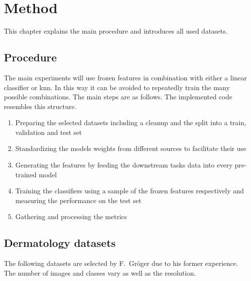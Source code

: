 \chapter{Method}\label{chapter_3}
This chapter explains the main procedure and introduces all used datasets.

\section{Procedure}
The main experiments will use frozen features in combination with either a linear classifier or \gls{knn}.
In this way it can be avoided to repeatedly train the many possible combinations.
The main steps are as follows.
The implemented code resembles this structure.

\begin{enumerate}
    \item Preparing the selected datasets including a cleanup and the split into a train, validation and test set
    \item Standardizing the models weights from different sources to facilitate their use
    \item Generating the features by feeding the downstream tasks data into every pre-trained model
    \item Training the classifiers using a sample of the frozen features respectively and measuring the performance on the test set
    \item Gathering and processing the metrics 
\end{enumerate}



\section{Dermatology datasets}\label{section:derma_datasets}
The following datasets are selected by F.~Gröger due to his former experience.
The number of images and classes vary as well as the resolution.


